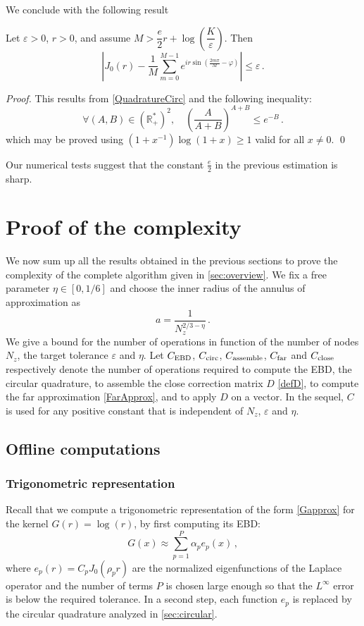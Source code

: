 \documentclass[smallextended]{svjour3}
\begin{document}
We conclude with the following result
\begin{proposition} Let $\varepsilon >0$, $r>0$, and assume $M > \dfrac{e}{2}r + \log\left(\dfrac{K}{\varepsilon}\right)$. Then 
	\[\left|J_0(r) -  \dfrac{1}{M}\sum_{m=0}^{M-1}e^{ir\sin\left(\frac{2m\pi}{M}-\varphi\right)} \right| \leq \varepsilon\,.\]
	\label{suboptCirc}
\end{proposition}
\begin{proof}
	This results from \autoref{QuadratureCirc} and the following inequality:
	\[ \forall (A,B) \in \left(\mathbb{R}_+^*\right)^2, \quad  \left( \dfrac{A}{A+B}\right)^{A+B} \leq e^{-B}\,.\]
	which may be proved using $\left(1+x^{-1}\right)\log(1+x) \geq 1$ valid for all $x \neq 0$. 
	\qed
\end{proof}
Our numerical tests suggest that the constant $\frac{e}{2}$ in the previous estimation is sharp. 
		
														
\section{Proof of the complexity}
\label{sec:complexities}
We now sum up all the results obtained in the previous sections to prove the complexity of the complete algorithm given in \autoref{sec:overview}. We fix a free parameter $\eta \in [0,1/6]$ and choose the inner radius of the annulus of approximation as
\begin{equation}
	\label{def_a}
	a = \dfrac{1}{N_z^{2/3 - \eta}}\,.
\end{equation}  
We give a bound for the number of operations in function of the number of nodes $N_z$, the target tolerance $\varepsilon$ and $\eta$. Let  $C_{\textup{EBD}}$, $C_{\textup{circ}}$, $C_{\textup{assemble}}$, $C_{\textup{far}}$ and $C_{\textup{close}}$ respectively denote the number of operations required  to compute the EBD, the circular quadrature, to assemble the close correction matrix $D$ \eqref{defD}, to compute the far approximation \eqref{FarApprox}, and to apply $D$ on a vector. In the sequel, $C$ is used for any positive constant that is independent of $N_z$, $\varepsilon$ and $\eta$. 
\subsection{Offline computations}
\subsubsection{Trigonometric representation}	
Recall that we compute a trigonometric representation of the form \eqref{Gapprox} for the kernel $G(r) =\log(r)$, by first computing its EBD:
\[ G(x) \approx \sum_{p=1}^P \alpha_p e_p(x)\,,\]
where $e_p(r) = C_p J_0(\rho_p r)$ are the normalized eigenfunctions of the Laplace operator and the number of terms $P$ is chosen large enough so that the $L^\infty$ error is below the required tolerance. In a second step, each function $e_p$ is replaced by the circular quadrature analyzed in \autoref{sec:circular}. 
\end{document}
